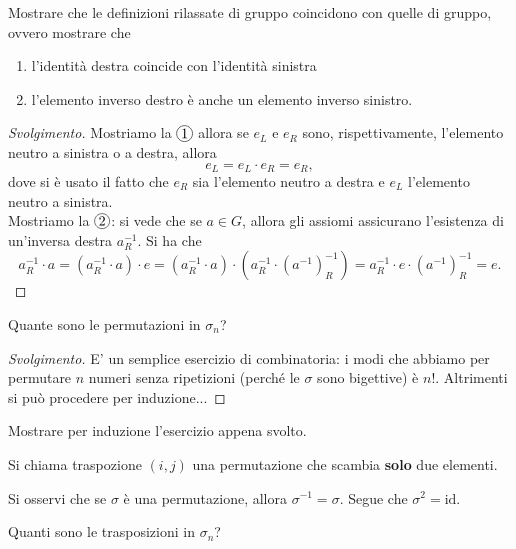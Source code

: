 \begin{exercise}[facoltativo]
    Mostrare che le definizioni rilassate di gruppo coincidono con quelle di gruppo, ovvero mostrare che
    \begin{enumerate}[label=\protect\circled{\arabic*}]
        \item l'identità destra coincide con l'identità sinistra
        \item l'elemento inverso destro è anche un elemento inverso sinistro.
    \end{enumerate}
\end{exercise}
\begin{proof}[Svolgimento]
    Mostriamo la $\circled{1}$ allora se $e_L$ e $e_R$ sono, rispettivamente, l'elemento neutro a sinistra o a destra, allora
    $$
    e_L = e_L \cdot e_R = e_R,
    $$
    dove si è usato il fatto che $e_R$ sia l'elemento neutro a destra e $e_L$ l'elemento neutro a sinistra. \\
    Mostriamo la $\circled{2}$: si vede che se $a \in G$, allora gli assiomi assicurano l'esistenza di un'inversa destra $a^{-1}_R$. Si ha che
    $$
        a^{-1}_R \cdot a = (a^{-1}_R \cdot a) \cdot e = (a^{-1}_R \cdot a) \cdot (a^{-1}_R \cdot (a^{-1})_R^{-1}) = a^{-1}_R \cdot e \cdot (a^{-1})_R^{-1} = e.
    $$
\end{proof}
\begin{exercise}
    Quante sono le permutazioni in $\sigma_n$?
\end{exercise}
\begin{proof}[Svolgimento]
    E' un semplice esercizio di combinatoria: i modi che abbiamo per permutare $n$ numeri senza ripetizioni (perché le $\sigma$ sono bigettive) è $n!$. Altrimenti si può procedere per induzione...
\end{proof}
\begin{exercise}
    Mostrare per induzione l'esercizio appena svolto.
\end{exercise}
\begin{definition}
    Si chiama traspozione $(i, j)$ una permutazione che scambia \textbf{solo} due elementi.
\end{definition}
\begin{remark}
    Si osservi che se $\sigma$ è una permutazione, allora $\sigma^{-1} = \sigma$. Segue che $\sigma^2 = \text{id}$.
\end{remark}
\begin{exercise}
    Quanti sono le trasposizioni in $\sigma_n$?
\end{exercise}
